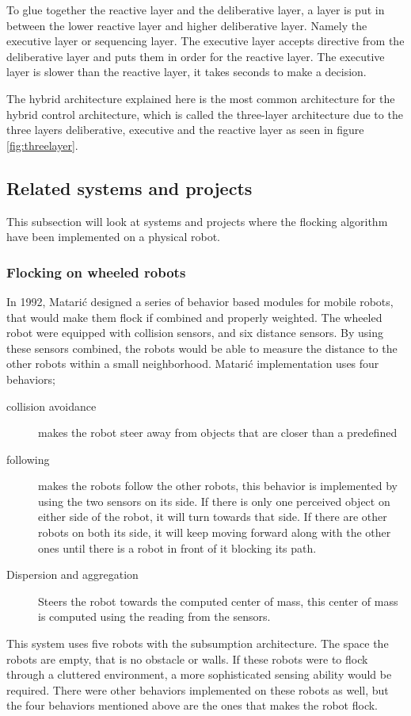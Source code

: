 To glue together the reactive layer and the deliberative layer, a layer is put in between the lower reactive layer and higher deliberative layer. Namely the executive layer or sequencing layer. The executive layer accepts directive from the deliberative layer and puts them in order for the reactive layer. The executive layer is slower than the reactive layer, it takes seconds to make a decision.

The hybrid architecture explained here is the most common architecture for the hybrid control architecture, which is called the three-layer architecture due to the three layers deliberative, executive and the reactive layer as seen in figure \ref{fig:threelayer}.


\subsection{Related systems and projects}
This subsection will look at systems and projects where the flocking algorithm have been implemented on a physical robot.

\subsubsection{Flocking on wheeled robots}
In 1992, Matari\'{c} designed a series of behavior based modules for mobile robots, that would make them flock if combined and properly weighted. The wheeled robot were equipped with collision sensors, and six distance sensors. By using these sensors combined, the robots would be able to measure the distance to the other robots within a small neighborhood. Matari\'c implementation uses four behaviors;
\begin{description}
\item[collision avoidance] makes the robot steer away from objects that are closer than a predefined
\item [following] makes the robots follow the other robots, this behavior is implemented by using the two sensors on its side. If there is only one perceived object on either side of the robot, it will turn towards that side. If there are other robots on both its side, it will keep moving forward along with the other ones until there is a robot in front of it blocking its path.
\item[Dispersion and aggregation] Steers the robot towards the computed center of mass, this center of mass is computed using the reading from the sensors.
\end{description}
This system uses five robots with the subsumption architecture. The space the robots are empty, that is no obstacle or walls. If these robots were to flock through a cluttered environment, a more sophisticated sensing ability would be required. There were other behaviors implemented on these robots as well, but the four behaviors mentioned above are the ones that makes the robot flock.

